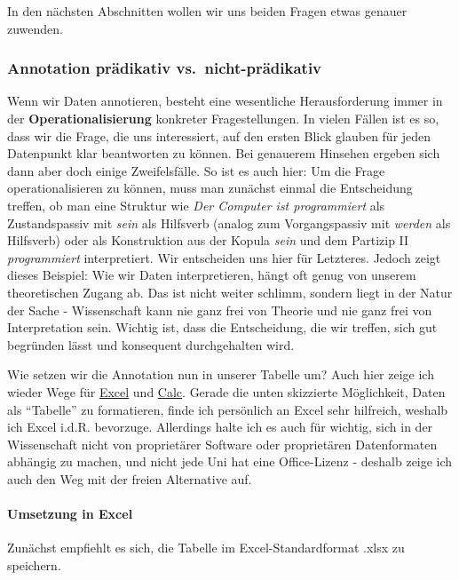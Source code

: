 \documentclass[]{article}
\let\oldparagraph\paragraph
\renewcommand{\paragraph}[1]{\oldparagraph{#1}\mbox{}}
\begin{document}
In den nächsten Abschnitten wollen wir uns beiden Fragen etwas genauer
zuwenden.

\subsubsection{Annotation prädikativ
vs.~nicht-prädikativ}\label{annotation-pradikativ-vs.nicht-pradikativ}

Wenn wir Daten annotieren, besteht eine wesentliche Herausforderung
immer in der \textbf{Operationalisierung} konkreter Fragestellungen. In
vielen Fällen ist es so, dass wir die Frage, die uns interessiert, auf
den ersten Blick glauben für jeden Datenpunkt klar beantworten zu
können. Bei genauerem Hinsehen ergeben sich dann aber doch einige
Zweifelsfälle. So ist es auch hier: Um die Frage operationalisieren zu
können, muss man zunächst einmal die Entscheidung treffen, ob man eine
Struktur wie \emph{Der Computer ist programmiert} als Zustandspassiv mit
\emph{sein} als Hilfsverb (analog zum Vorgangspassiv mit \emph{werden}
als Hilfsverb) oder als Konstruktion aus der Kopula \emph{sein} und dem
Partizip II \emph{programmiert} interpretiert. Wir entscheiden uns hier
für Letzteres. Jedoch zeigt dieses Beispiel: Wie wir Daten
interpretieren, hängt oft genug von unserem theoretischen Zugang ab. Das
ist nicht weiter schlimm, sondern liegt in der Natur der Sache -
Wissenschaft kann nie ganz frei von Theorie und nie ganz frei von
Interpretation sein. Wichtig ist, dass die Entscheidung, die wir
treffen, sich gut begründen lässt und konsequent durchgehalten wird.

Wie setzen wir die Annotation nun in unserer Tabelle um? Auch hier zeige
ich wieder Wege für \protect\hyperlink{umsetzung-in-excel}{Excel} und
\protect\hyperlink{umsetzung-in-libreoffice-calc}{Calc}. Gerade die
unten skizzierte Möglichkeit, Daten als ``Tabelle'' zu formatieren,
finde ich persönlich an Excel sehr hilfreich, weshalb ich Excel i.d.R.
bevorzuge. Allerdings halte ich es auch für wichtig, sich in der
Wissenschaft nicht von proprietärer Software oder proprietären
Datenformaten abhängig zu machen, und nicht jede Uni hat eine
Office-Lizenz - deshalb zeige ich auch den Weg mit der freien
Alternative auf.

\hypertarget{umsetzung-in-excel}{\paragraph{Umsetzung in
Excel}\label{umsetzung-in-excel}}

Zunächst empfiehlt es sich, die Tabelle im Excel-Standardformat .xlsx zu
speichern.
\end{document}
